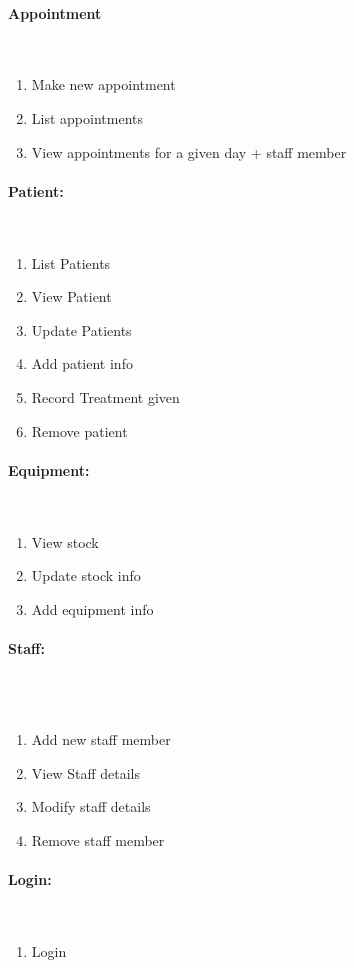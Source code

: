 \documentclass{unitemplate}
\begin{document}
\paragraph{Appointment}~\\
\begin{enumerate}
	\item Make new appointment
	\item List appointments
	\item View appointments for a given day + staff member
\end{enumerate}
\paragraph{Patient:}~\\
\begin{enumerate}
	\item List Patients
	\item View Patient
	\item Update Patients
	\item Add patient info
	\item Record Treatment given
	\item Remove patient
\end{enumerate}
\paragraph{Equipment:}~\\
\begin{enumerate}
	\item View stock
	\item Update stock info
	\item Add equipment info
\end{enumerate}
\paragraph{Staff:}~\\\
\begin{enumerate}
	\item Add new staff member
	\item View Staff details
	\item Modify staff details
	\item Remove staff member
\end{enumerate}
\paragraph{Login:}~\\
\begin{enumerate}
	\item Login
\end{enumerate}
\end{document}

